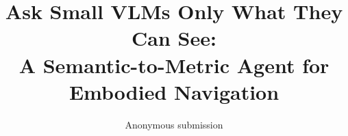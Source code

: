 \documentclass[10pt,twocolumn,letterpaper]{article}
\title{Ask Small VLMs Only What They Can See:\\A Semantic-to-Metric Agent for Embodied Navigation}
\author{Anonymous submission}
\begin{document}
\maketitle







\clearpage
{
    \small
    
    
}
\end{document}
